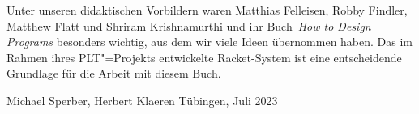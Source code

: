Unter unseren didaktischen Vorbildern waren Matthias
Felleisen, Robby Findler, Matthew Flatt und Shriram Krishnamurthi und
ihr Buch~\textit{How to Design Programs}
\cite{FelleisenFindlerFlattKrishnamurthi2001} besonders wichtig, aus
dem wir viele Ideen übernommen haben.  Das im Rahmen ihres
PLT"=Projekts entwickelte Racket-System ist eine entscheidende
Grundlage für die Arbeit mit diesem Buch.


\begin{flushright}
  Michael Sperber, Herbert Klaeren
  Tübingen, Juli 2023
\end{flushright}


\newpage

\thispagestyle{empty}


